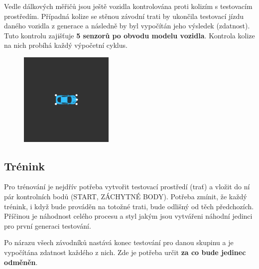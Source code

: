 \documentclass[a4paper,12pt]{article}
\newcommand{\tab}
{
    \hspace*{1em}
}
\begin{document}
            Vedle dálkových měřičů jsou ještě vozidla kontrolována proti kolizím s testovacím 
            prostředím. Případná kolize se stěnou závodní trati by ukončila testovací jízdu
            daného vozidla z generace a následně by byl vypočítán jeho výsledek (zdatnost).
            Tuto kontrolu zajišťuje \textbf{5 senzorů po obvodu modelu vozidla}. Kontrola
            kolize na nich probíhá každý výpočetní cyklus.
            \begin{figure}[H]
                \centering
                \includegraphics[trim = 7cm 7cm 7cm 7cm, clip, width=0.4\textwidth]{data/collisionpoints.png}
                \label{fig:collisionpoints}
            \end{figure}

        \vspace*{-3em}
        \subsection{Trénink}
            Pro trénování je nejdřív potřeba vytvořit testovací prostředí (trať) a vložit
            do ní pár kontrolních bodů (START, ZÁCHYTNÉ BODY). Potřeba zmínit,
            že každý trénink, i když bude prováděn na totožné trati, bude odlišný od těch
            předchozích. Příčinou je náhodnost celého procesu a styl jakým jsou vytvářeni
            náhodní jedinci pro první generaci testování.

            \tab Po nárazu všech závodníků nastává konec testování pro danou skupinu a 
            je vypočítána zdatnost každého z nich. Zde je potřeba určit \textbf{za co bude jedinec
            odměněn}. 
            
\end{document}
